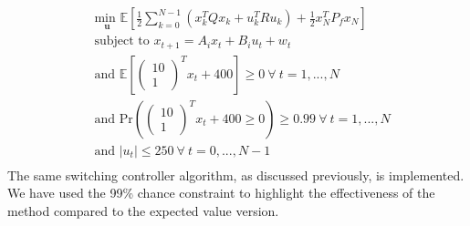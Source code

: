 \begin{equation}
\begin{aligned}
&\underset{\mathbf{u}}{\text{min }} \mathbb{E}\left[ \frac{1}{2}\sum_{k=0}^{N-1} \left( x_k^TQx_k + u_k^TRu_k \right) + \frac{1}{2}x_N^TP_fx_N \right] \\
& \text{subject to } x_{t+1}=A_ix_t+B_iu_t + w_t\\
& \text{and } \mathbb{E}[\begin{pmatrix}
10 \\ 1
\end{pmatrix}^Tx_t + 400] \geq 0 ~\forall ~t=1,...,N \\
& \text{and } \text{Pr}(\begin{pmatrix}
10 \\ 1
\end{pmatrix}^T x_t + 400 \geq 0) \geq 0.99 ~\forall ~t=1,...,N\\
& \text{and } |u_t| \leq 250 ~\forall ~t=0,...,N-1\\
\end{aligned}
\label{eq_spf_mpc_chance}
\end{equation} 
The same switching controller algorithm, as discussed previously, is implemented. We have used the 99\% chance constraint to highlight the effectiveness of the method compared to the expected value version. 

